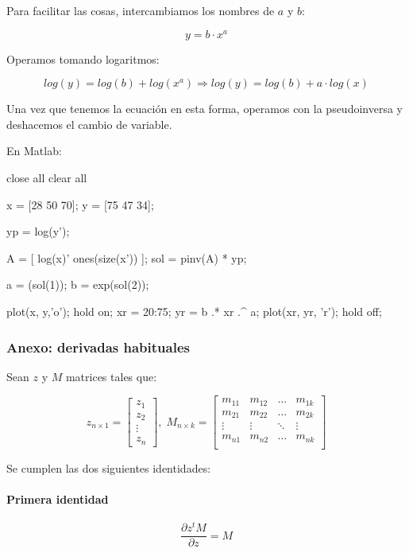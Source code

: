 \documentclass[11pt]{scrartcl}
\begin{document}
Para facilitar las cosas, intercambiamos los nombres de $a$ y $b$:

\[
y = b \cdot x^a
\]

Operamos tomando logaritmos:

\[
log(y) = log(b) + log(x^a) \Rightarrow log(y) = log(b) + a \cdot log(x)
\]

Una vez que tenemos la ecuación en esta forma, operamos con la pseudoinversa y
deshacemos el cambio de variable.

En Matlab:

\begin{matlabcode}
close all
clear all

x = [28 50 70];
y = [75 47 34];

yp = log(y');

A = [ log(x)' ones(size(x')) ];
sol = pinv(A) * yp;

a = (sol(1));
b = exp(sol(2));

plot(x, y,'o'); hold on;
xr = 20:75;
yr = b .* xr .^ a;
plot(xr, yr, 'r'); hold off;  
\end{matlabcode}


\subsubsection{Anexo: derivadas habituales}
\label{sec:derivadas_columna}

Sean $z$ y $M$ matrices tales que:

$$
z_{n \times 1} = 
\begin{bmatrix}
z_1 \\
z_2 \\
\vdots \\
z_n
\end{bmatrix},
\;
M_{n \times k} =
\begin{bmatrix}
m_{11} & m_{12} & \dots & m_{1k} \\
m_{21} & m_{22} & \dots & m_{2k} \\
\vdots & \vdots & \ddots & \vdots \\
m_{n1} & m_{n2} & \dots & m_{nk} \\
\end{bmatrix}
$$

Se cumplen las dos siguientes identidades:

\paragraph{Primera identidad}

$$
\frac{\partial z^t M}{\partial z} = M
$$
\end{document}
